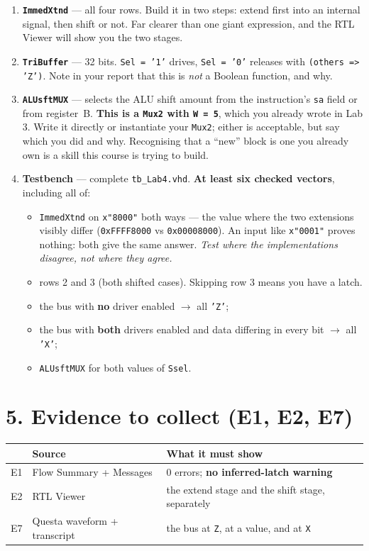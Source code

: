 \documentclass[11pt]{article}
\newcommand{\code}[1]{\texttt{#1}}
\begin{document}
\begin{enumerate}[leftmargin=2em,itemsep=3pt]
\item \textbf{\code{ImmedXtnd}} --- all four rows. Build it in two steps: extend
first into an internal signal, then shift or not. Far clearer than one giant
expression, and the RTL Viewer will show you the two stages.

\item \textbf{\code{TriBuffer}} --- 32 bits. \code{Sel = '1'} drives,
\code{Sel = '0'} releases with \code{(others => 'Z')}. Note in your report that
this is \emph{not} a Boolean function, and why.

\item \textbf{\code{ALUsftMUX}} --- selects the ALU shift amount from the
instruction's \code{sa} field or from register~B. \textbf{This is a \code{Mux2}
with \code{W = 5}}, which you already wrote in Lab 3. Write it directly or
instantiate your \code{Mux2}; either is acceptable, but say which you did and
why. Recognising that a ``new'' block is one you already own is a skill this
course is trying to build.

\item \textbf{Testbench} --- complete \code{tb\_Lab4.vhd}. \textbf{At least six
checked vectors}, including all of:
\begin{itemize}[leftmargin=1.4em,itemsep=1pt]
\item \code{ImmedXtnd} on \code{x"8000"} both ways --- the value where the two
extensions visibly differ (\code{0xFFFF8000} vs \code{0x00008000}). An input like
\code{x"0001"} proves nothing: both give the same answer. \emph{Test where the
implementations disagree, not where they agree.}
\item rows 2 and 3 (both shifted cases). Skipping row 3 means you have a latch.
\item the bus with \textbf{no} driver enabled $\to$ all \code{'Z'};
\item the bus with \textbf{both} drivers enabled and data differing in every bit
$\to$ all \code{'X'};
\item \code{ALUsftMUX} for both values of \code{Ssel}.
\end{itemize}
\end{enumerate}

\section*{5. Evidence to collect (E1, E2, E7)}

\begin{center}
\begin{tabular}{lll}
\toprule
& Source & What it must show \\
\midrule
E1 & Flow Summary + Messages & 0 errors; \textbf{no inferred-latch warning} \\
E2 & RTL Viewer & the extend stage and the shift stage, separately \\
E7 & Questa waveform + transcript & the bus at \code{Z}, at a value, and at \code{X} \\
\bottomrule
\end{tabular}
\end{center}
\end{document}
